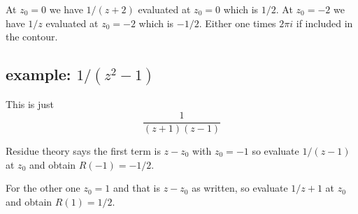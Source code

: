 \documentclass[11pt, oneside]{article}
\begin{document}
\label{sec:ex3R}

At $z_0 = 0$ we have $1/(z+2)$ evaluated at $z_0 = 0$ which is $1/2$.  At $z_0 = -2$ we have $1/z$ evaluated at $z_0 = -2$ which is $-1/2$.  Either one times $2 \pi i$ if included in the contour.

\subsection*{example:  $1/(z^2 - 1)$}

\label{sec:ex4R}

This is just
\[ \frac{1}{(z + 1)(z - 1)} \]

Residue theory says the first term is $z - z_0$ with $z_0 = -1$ so evaluate $1/(z - 1)$ at $z_0$ and obtain $R(-1) = -1/2$.

For the other one $z_0 = 1$ and that is $z - z_0$ as written, so evaluate $1/z+1$ at $z_0$ and obtain $R(1) = 1/2$.
\end{document}
